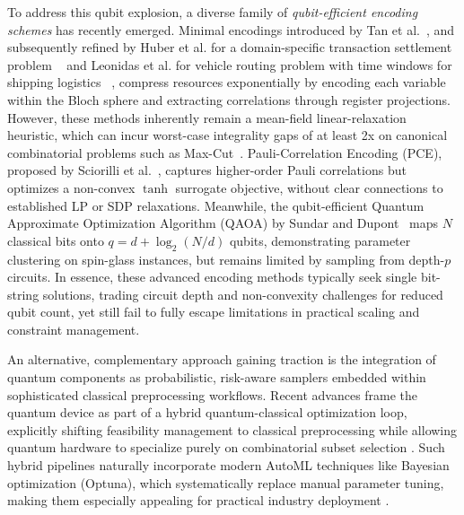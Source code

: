 To address this qubit explosion, a diverse family of \emph{qubit-efficient encoding schemes} has recently emerged.
Minimal encodings introduced by Tan et al.~\cite{tan_qubit-efficient_2021}, 
and subsequently refined by Huber et al. for a domain-specific transaction settlement problem ~\cite{huber_exponential_2024} and Leonidas et al. for vehicle routing problem with time windows for shipping logistics ~\cite{leonidas_qubit_2024}, 
compress resources exponentially by encoding each variable within the Bloch sphere and extracting correlations through register projections.
However, these methods inherently remain a mean-field linear-relaxation heuristic,
which can incur worst-case integrality gaps of at least 2x on canonical combinatorial problems such as Max-Cut~\cite{charikar_integrality_2009}.
Pauli-Correlation Encoding (PCE), proposed by Sciorilli et al.~\cite{sciorilli_towards_2025}, 
captures higher-order Pauli correlations but optimizes a non-convex \(\tanh\) surrogate objective, 
without clear connections to established LP or SDP relaxations.
Meanwhile, the qubit-efficient Quantum Approximate Optimization Algorithm (QAOA) by Sundar and Dupont~\cite{sundar_qubit-efficient_2024} 
maps \(N\) classical bits onto \(q = d + \log_2(N/d)\) qubits, demonstrating parameter clustering on spin-glass instances, 
but remains limited by sampling from depth-\(p\) circuits.
In essence, these advanced encoding methods typically seek single bit-string solutions, 
trading circuit depth and non-convexity challenges for reduced qubit count, yet still fail to fully escape
limitations in practical scaling and constraint management.

An alternative, complementary approach gaining traction is the integration of quantum components as
probabilistic, risk-aware samplers embedded within sophisticated classical preprocessing workflows.
Recent advances frame the quantum device as part of a hybrid quantum-classical optimization loop,
explicitly shifting feasibility management to classical preprocessing while allowing quantum
hardware to specialize purely on combinatorial subset selection \cite{matsuyama_sampling-based_2025}.
Such hybrid pipelines naturally incorporate modern AutoML techniques like Bayesian optimization (Optuna),
which systematically replace manual parameter tuning, 
making them especially appealing for practical industry deployment \cite{akiba_optuna_2019,tibaldi_bayesian_2023,caramanis_optimizing_2023}.

